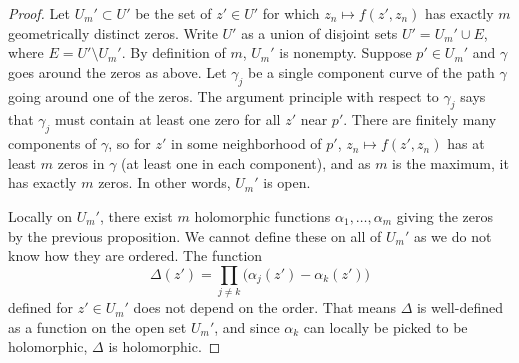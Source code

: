 \documentclass[12pt,openany]{book}
\theoremstyle{plain}
\theoremstyle{remark}
\theoremstyle{definition}
\theoremstyle{exercise}
\theoremstyle{example}
\begin{document}
\begin{proof}
Let $U_m' \subset U'$ be the set of $z' \in U'$ for which $z_n \mapsto f(z',z_n)$
has exactly $m$ geometrically distinct zeros.
Write $U'$ as a union of disjoint sets $U' = U_m' \cup E$, where $E = U'
\setminus U_m'$.
By definition of $m$, $U_m'$ is nonempty.  Suppose $p' \in U_m'$ and $\gamma$
goes around the zeros as above.  Let $\gamma_j$ be a single component curve
of the path $\gamma$ going around one of the zeros.
The argument principle with respect to $\gamma_j$ says that
$\gamma_j$ must contain at least one zero for all $z'$ near $p'$.
There are finitely many components of $\gamma$,
so for $z'$ in some neighborhood of $p'$,
$z_n \mapsto f(z',z_n)$ has at least $m$ zeros in $\gamma$
(at least one in each component),
and as $m$ is the maximum, it has exactly $m$ zeros.
In other words, $U_m'$ is open.

Locally on $U_m'$, there exist $m$ holomorphic functions
$\alpha_1, \ldots, \alpha_m$ giving the zeros by the previous proposition.
We cannot define these on all of $U_m'$ as we do not know how they are
ordered.
The function
\begin{equation*}
\Delta(z') = \prod_{j \not= k} \bigl( \alpha_j(z') - \alpha_k(z') \bigr)
\end{equation*}
defined for $z' \in U_m'$ does not depend on the order.
That means $\Delta$ is well-defined as a function on the open set $U_m'$,
and since $\alpha_k$ can locally be picked to be holomorphic,
$\Delta$ is holomorphic.


\end{proof}
\end{document}
